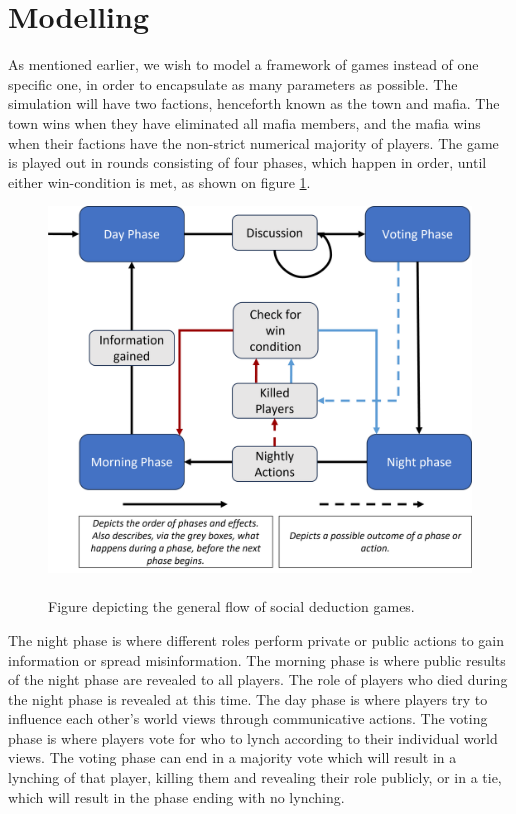 \section{Modelling}
As mentioned earlier, we wish to model a framework of games instead of one
specific one, in order to encapsulate as many parameters as possible. The
simulation will have two factions, henceforth known as the town and mafia. The
town wins when they have eliminated all mafia members, and the mafia wins when
their factions have the non-strict numerical majority of players. The game is
played out in rounds consisting of four phases, which happen in order, until
either win-condition is met, as shown on figure \ref{fig:GameOverview}.
\begin{figure}[H]
	\includegraphics[width=1\linewidth]{figures/Game_overview}
	\caption{\\Figure depicting the general flow of social deduction games.}
	\label{fig:GameOverview}
\end{figure}

The night phase is where different roles perform private or public actions to
gain information or spread misinformation. The morning phase is where public
results of the night phase are revealed to all players. The role of players who
died during the night phase is revealed at this time. The day phase is where
players try to influence each other's world views through communicative
actions. The voting phase is where players vote for who to lynch according to
their individual world views. The voting phase can end in a majority vote which
will result in a lynching of that player, killing them and revealing their role
publicly, or in a tie, which will result in the phase ending with no lynching.

